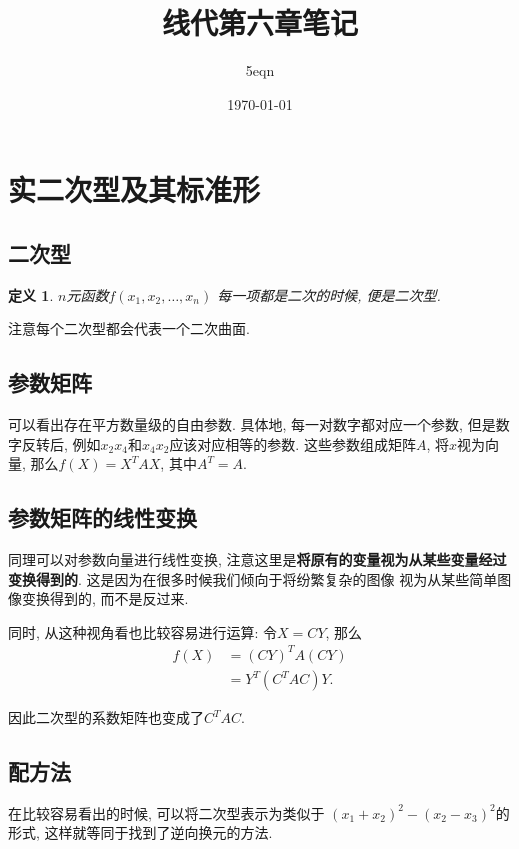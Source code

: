 \documentclass[UTF8,a4paper,11pt]{ctexart}
\title{线代第六章笔记}
\author{5eqn}
\date{\today}
\newtheorem{definition}{定义}
\begin{document}
  \maketitle
  \section{实二次型及其标准形}
    \subsection{二次型}
      \begin{definition}
        $n$元函数$ f\left(x_1,x_2,\ldots,x_{n}\right)$
        每一项都是二次的时候, 便是二次型.
      \end{definition}
      
      注意每个二次型都会代表一个二次曲面.

    \subsection{参数矩阵}
      可以看出存在平方数量级的自由参数.
      具体地, 每一对数字都对应一个参数,
      但是数字反转后, 例如$x_2x_4$和$x_4x_2$应该对应相等的参数.
      这些参数组成矩阵$A$, 将$x$视为向量,
      那么$f\left(X\right)=X^{T}AX$, 其中$A^{T}=A$.

    \subsection{参数矩阵的线性变换}
      同理可以对参数向量进行线性变换,
      注意这里是\textbf{将原有的变量视为从某些变量经过变换得到的}.
      这是因为在很多时候我们倾向于将纷繁复杂的图像
      视为从某些简单图像变换得到的,
      而不是反过来.
      
      同时, 从这种视角看也比较容易进行运算:
      令$X=CY$,
      那么
      \[
      \begin{aligned}
        f\left(X\right)&=
        \left(CY\right)^{T}A\left(CY\right)
        \\&=Y^{T}\left(C^{T}AC\right)Y
      .\end{aligned}
      \]
      
      因此二次型的系数矩阵也变成了$C^{T}AC$.

    \subsection{配方法}
      在比较容易看出的时候, 可以将二次型表示为类似于
      $\left(x_1+x_2\right)^{2}-\left(x_2-x_3\right)^{2}$的形式,
      这样就等同于找到了逆向换元的方法.
\end{document}
